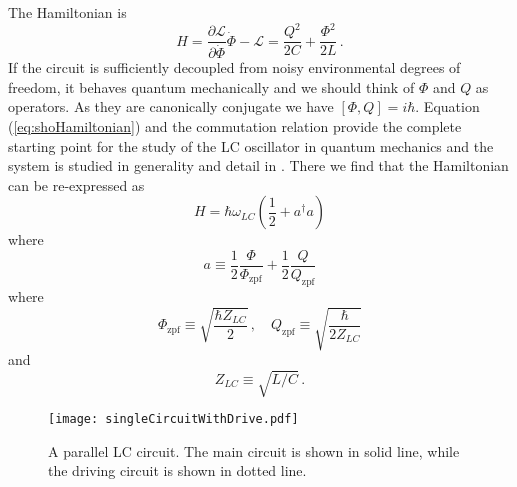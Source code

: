 The Hamiltonian is
\begin{equation}
H = \frac{\partial \mathcal{L}}{\partial \dot{\Phi}} \dot{\Phi} - \mathcal{L}
= \frac{Q^2}{2C} + \frac{\Phi^2}{2L} \, . \label{eq:shoHamiltonian}
\end{equation}
If the circuit is sufficiently decoupled from noisy environmental degrees of freedom, it behaves quantum mechanically and we should think of $\Phi$ and $Q$ as operators.
As they are canonically conjugate we have $[\Phi,Q]=i\hbar$.
Equation (\ref{eq:shoHamiltonian}) and the commutation relation provide the complete starting point for the study of the LC oscillator in quantum mechanics and the system is studied in generality and detail in \citeinternaltype {}.
There we find that the Hamiltonian can be re-expressed as
\begin{equation}
H = \hbar \omega_{LC} \left( \frac{1}{2} + a^\dagger a \right)
\end{equation}
where
\begin{equation}
a \equiv
\frac{1}{2} \frac{\Phi}{\Phi_\text{zpf}}
+ \frac{1}{2} \frac{Q}{Q_\text{zpf}}
\end{equation}
where
\begin{equation}
\Phi_\text{zpf} \equiv \sqrt{\frac{\hbar Z_{LC}}{2}} \, ,
\quad
Q_\text{zpf} \equiv \sqrt{\frac{\hbar}{2 Z_{LC}}}
\end{equation}
and
\begin{equation}
Z_{LC} \equiv \sqrt{L/C} \, .
\end{equation}

\begin{figure}
\begin{centering}
\texttt{[image: singleCircuitWithDrive.pdf]} 
\par\end{centering}
\caption{A parallel LC circuit. The main circuit is shown in solid line, while the driving circuit is shown in dotted line.}
\label{Fig:singleCircuit}
\end{figure}

